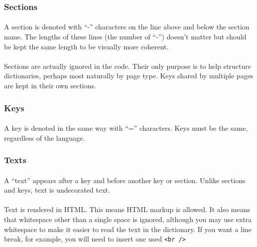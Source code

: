 \subsubsection{Sections}

\paragraph{}
A section is denoted with ``-'' characters on the line above and below the section name.  The lengths of these lines (the number of ``-'') doesn't matter but should be kept the same length to be visually more coherent.  

\paragraph{}
Sections are actually ignored in the code.  Their only purpose is to help structure dictionaries, perhaps most naturally by page type.  Keys shared by multiple pages are kept in their own sections.


\subsubsection{Keys}

\paragraph{}
A key is denoted in the same way with ``='' characters.  Keys must be the same, regardless of the language. 


\subsubsection{Texts}

\paragraph{}
A ``text'' appears after a key and before another key or section.  Unlike sections and keys, text is undecorated text.  

\paragraph{}
Text is rendered in HTML.  This means HTML markup is allowed.  It also means that whitespace other than a single space is ignored, although you may use extra whitespace to make it easier to read the text in the dictionary.  If you want a line break, for example, you will need to insert one used \texttt{<br />}


